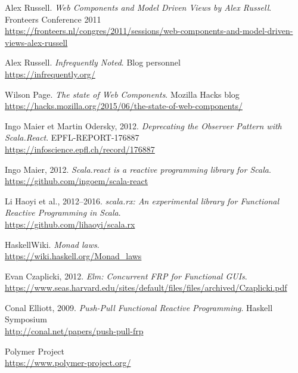 \renewcommand\bibname{Références}
\begin{thebibliography}{99}

Alex Russell.
\emph{Web Components and Model Driven Views by Alex Russell}.
Fronteers Conference 2011\\
\url{https://fronteers.nl/congres/2011/sessions/web-components-and-model-driven-views-alex-russell}

Alex Russell.
\emph{Infrequently Noted}.
Blog personnel\\
\url{https://infrequently.org/}

Wilson Page.
\emph{The state of Web Components}.
Mozilla Hacks blog\\
\url{https://hacks.mozilla.org/2015/06/the-state-of-web-components/}

Ingo Maier et Martin Odersky, 2012.
\emph{Deprecating the Observer Pattern with Scala.React}.
EPFL-REPORT-176887\\
\url{https://infoscience.epfl.ch/record/176887}

Ingo Maier, 2012.
\emph{Scala.react is a reactive programming library for Scala}.\\
\url{https://github.com/ingoem/scala-react}

Li Haoyi et al., 2012--2016.
\emph{scala.rx: An experimental library for Functional Reactive Programming in Scala}.\\
\url{https://github.com/lihaoyi/scala.rx}

HaskellWiki.
\emph{Monad laws}.\\
\url{https://wiki.haskell.org/Monad_laws}

Evan Czaplicki, 2012.
\emph{Elm: Concurrent FRP for Functional GUIs}.
\\
\url{https://www.seas.harvard.edu/sites/default/files/files/archived/Czaplicki.pdf}

Conal Elliott, 2009.
\emph{Push-Pull Functional Reactive Programming}.
Haskell Symposium\\
\url{http://conal.net/papers/push-pull-frp}

Polymer Project\\
\url{https://www.polymer-project.org/}

\end{thebibliography}